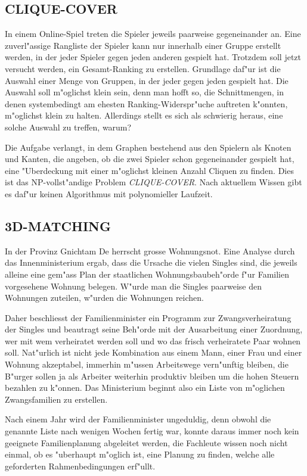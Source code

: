 \subsection{CLIQUE-COVER}
In einem Online-Spiel treten die Spieler jeweils paarweise gegeneinander an.
Eine zuverl"assige Rangliste der Spieler kann nur innerhalb
einer Gruppe erstellt werden, in der jeder Spieler gegen
jeden anderen gespielt hat. Trotzdem soll jetzt versucht werden,
ein Gesamt-Ranking zu erstellen. Grundlage daf"ur ist die Auswahl
einer Menge von Gruppen, in der jeder gegen jeden gespielt hat.
Die Auswahl soll m"oglichst klein sein, denn man hofft so, die
Schnittmengen, in denen systembedingt am ehesten Ranking-Widerspr"uche
auftreten k"onnten, m"oglichst klein zu halten. Allerdings stellt es
sich als schwierig heraus, eine solche Auswahl zu treffen, warum?

\medskip

Die Aufgabe verlangt, in dem Graphen bestehend aus den Spielern
als Knoten und Kanten, die angeben, ob die zwei Spieler schon gegeneinander
gespielt hat, eine "Uberdeckung mit einer m"oglichst
kleinen Anzahl Cliquen zu finden. Dies ist das NP-vollst"andige Problem
{\it CLIQUE-COVER}. Nach aktuellem Wissen gibt es daf"ur keinen
Algorithmus mit polynomieller Laufzeit.

\subsection{3D-MATCHING}
In der Provinz Gnichtam De herrscht grosse Wohnungsnot.
Eine Analyse durch das Innenministerium ergab, dass die Ursache
die vielen Singles sind, die jeweils alleine eine gem"ass
Plan der staatlichen Wohnungsbaubeh"orde f"ur Familien vorgesehene
Wohnung belegen.
W"urde man die Singles paarweise den Wohnungen zuteilen, w"urden die
Wohnungen reichen.

Daher beschliesst der Familienminister ein Programm zur Zwangsverheiratung
der Singles und beautragt seine Beh"orde mit der Ausarbeitung einer Zuordnung,
wer mit wem verheiratet werden soll und wo das frisch verheiratete Paar
wohnen soll.
Nat"urlich ist nicht jede Kombination aus einem Mann,
einer Frau und einer Wohnung akzeptabel, immerhin m"ussen 
Arbeitswege vern"unftig bleiben, die B"urger sollen ja als 
Arbeiter weiterhin produktiv bleiben um die hohen Steuern bezahlen zu k"onnen.
Das Ministerium beginnt also ein Liste von m"oglichen Zwangsfamilien
zu erstellen.

Nach einem Jahr wird der Familienminister ungeduldig, denn obwohl die
genannte Liste nach wenigen Wochen fertig war, konnte daraus immer noch
kein geeignete Familienplanung abgeleitet werden, die Fachleute wissen
noch nicht einmal, ob es "uberhaupt m"oglich ist, eine Planung
zu finden, welche alle geforderten Rahmenbedingungen erf"ullt.

